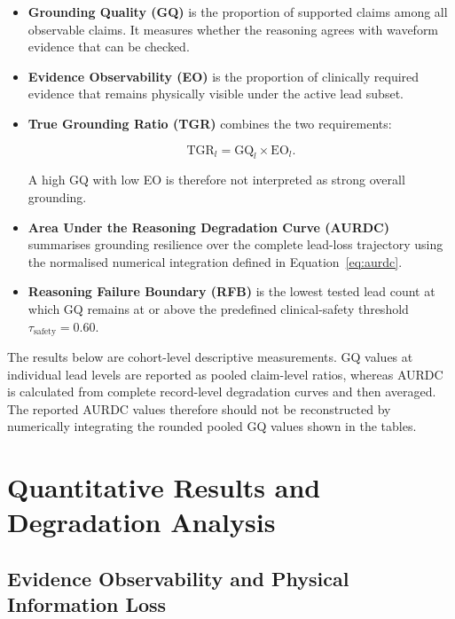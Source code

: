 \documentclass{ssnreview}
\begin{document}
\begin{itemize}
  \item \textbf{Grounding Quality (GQ)} is the proportion of supported claims among all
  observable claims. It measures whether the reasoning agrees with waveform evidence that
  can be checked.

  \item \textbf{Evidence Observability (EO)} is the proportion of clinically required
  evidence that remains physically visible under the active lead subset.

  \item \textbf{True Grounding Ratio (TGR)} combines the two requirements:

  \begin{equation}
    \mathrm{TGR}_l=\mathrm{GQ}_l\times\mathrm{EO}_l.
    \label{eq:tgr-results}
  \end{equation}

  A high GQ with low EO is therefore not interpreted as strong overall grounding.

  \item \textbf{Area Under the Reasoning Degradation Curve (AURDC)} summarises grounding
  resilience over the complete lead-loss trajectory using the normalised numerical
  integration defined in Equation~\ref{eq:aurdc}.

  \item \textbf{Reasoning Failure Boundary (RFB)} is the lowest tested lead count at which
  GQ remains at or above the predefined clinical-safety threshold
  $\tau_{\mathrm{safety}}=0.60$.
\end{itemize}

The results below are cohort-level descriptive measurements. GQ values at individual lead
levels are reported as pooled claim-level ratios, whereas AURDC is calculated from
complete record-level degradation curves and then averaged. The reported AURDC values
therefore should not be reconstructed by numerically integrating the rounded pooled GQ
values shown in the tables.

\section{Quantitative Results and Degradation Analysis}

\subsection{Evidence Observability and Physical Information Loss}
\end{document}
